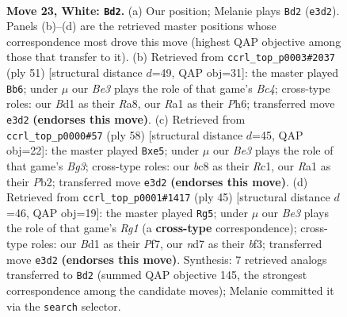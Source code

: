 \documentclass[11pt]{article}
\begin{document}
\clearpage

\begin{figure}[p]\centering
\begin{subfigure}{0.46\textwidth}\centering
\resizebox{\linewidth}{!}{%
\newchessgame
\chessboard[
  setfen={r1b4k/3n4/1p4p1/2p2p2/2P2P1p/p1P1B3/P5PP/R2B2K1 w - - 2 23},
  showmover=false,
  pgfstyle=straightmove, color=movearrow, markmove={e3-d2}
]}
\caption{}
\end{subfigure}\hfill
\begin{subfigure}{0.46\textwidth}\centering
\resizebox{\linewidth}{!}{%
\newchessgame
\chessboard[
  setfen={r7/1p2kp2/2p2p1p/2b1pP2/p3B3/2P3P1/PP2KP1P/5R2 b - - 6 26},
  showmover=false,
  pgfstyle=straightmove, color=movearrow, markmove={c5-b6}
]}
\caption{}
\end{subfigure}
\\[4pt]
\begin{subfigure}{0.46\textwidth}\centering
\resizebox{\linewidth}{!}{%
\newchessgame
\chessboard[
  setfen={b3k2r/5ppp/p7/3npP2/Pp6/1N4B1/1PP3PP/2R3K1 w k - 0 30},
  showmover=false,
  pgfstyle=straightmove, color=movearrow, markmove={g3-e5}
]}
\caption{}
\end{subfigure}\hfill
\begin{subfigure}{0.46\textwidth}\centering
\resizebox{\linewidth}{!}{%
\newchessgame
\chessboard[
  setfen={1k4r1/pp3p2/4p3/1P2b3/4Pp1p/5B2/1PP2PPP/2K4R b - - 2 23},
  showmover=false,
  pgfstyle=straightmove, color=movearrow, markmove={g8-g5}
]}
\caption{}
\end{subfigure}
\caption{\textbf{Move 23, White: \texttt{Bd2}.} (a) Our position; Melanie plays \texttt{Bd2} (\texttt{e3d2}). Panels (b)--(d) are the retrieved master positions whose correspondence most drove this move (highest QAP objective among those that transfer to it). (b) Retrieved from \texttt{ccrl\_top\_p0003\#2037} (ply 51) [structural distance $d$=49, QAP obj=31]: the master played \texttt{Bb6}; under $\mu$ our \emph{Be3} plays the role of that game's \emph{Bc4}; cross-type roles: our \emph{B}d1 as their \emph{R}a8, our \emph{R}a1 as their \emph{P}h6; transferred move \texttt{e3d2} \textbf{(endorses this move)}. (c) Retrieved from \texttt{ccrl\_top\_p0000\#57} (ply 58) [structural distance $d$=45, QAP obj=22]: the master played \texttt{Bxe5}; under $\mu$ our \emph{Be3} plays the role of that game's \emph{Bg3}; cross-type roles: our \emph{b}c8 as their \emph{R}c1, our \emph{R}a1 as their \emph{P}b2; transferred move \texttt{e3d2} \textbf{(endorses this move)}. (d) Retrieved from \texttt{ccrl\_top\_p0001\#1417} (ply 45) [structural distance $d$=46, QAP obj=19]: the master played \texttt{Rg5}; under $\mu$ our \emph{Be3} plays the role of that game's \emph{Rg1} (a \textbf{cross-type} correspondence); cross-type roles: our \emph{B}d1 as their \emph{P}f7, our \emph{n}d7 as their \emph{b}f3; transferred move \texttt{e3d2} \textbf{(endorses this move)}. Synthesis: 7 retrieved analogs transferred to \texttt{Bd2} (summed QAP objective 145, the strongest correspondence among the candidate moves); Melanie committed it via the \texttt{search} selector.}
\label{fig:thought-m44}
\end{figure}
\end{document}

